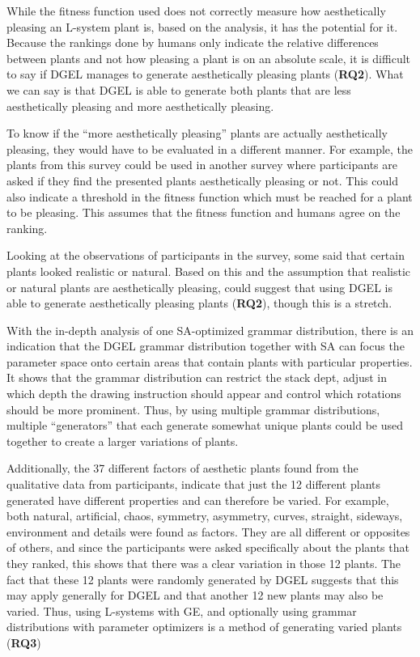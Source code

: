 While the fitness function used does not correctly measure how aesthetically pleasing an \gls{L-system} plant is, based on the analysis, it has the potential for it.
Because the rankings done by humans only indicate the relative differences between plants and not how pleasing a plant is on an absolute scale, it is difficult to say if \gls{DGEL} manages to generate aesthetically pleasing plants (\textbf{RQ2}).
What we can say is that \gls{DGEL} is able to generate both plants that are less aesthetically pleasing and more aesthetically pleasing.

To know if the ``more aesthetically pleasing'' plants are actually aesthetically pleasing, they would have to be evaluated in a different manner.
For example, the plants from this survey could be used in another survey where participants are asked if they find the presented plants aesthetically pleasing or not.
This could also indicate a threshold in the fitness function which must be reached for a plant to be pleasing.
This assumes that the fitness function and humans agree on the ranking.

Looking at the observations of participants in the survey, some said that certain plants looked realistic or natural.
Based on this and the assumption that realistic or natural plants are aesthetically pleasing, could suggest that using \gls{DGEL} is able to generate aesthetically pleasing plants (\textbf{RQ2}), though this is a stretch.

With the in-depth analysis of one \gls{SA}-optimized grammar distribution, there is an indication that the \gls{DGEL} grammar distribution together with \gls{SA} can focus the parameter space onto certain areas that contain plants with particular properties.
It shows that the grammar distribution can restrict the stack dept, adjust in which depth the drawing instruction should appear and control which rotations should be more prominent.
Thus, by using multiple grammar distributions, multiple ``generators'' that each generate somewhat unique plants could be used together to create a larger variations of plants.

Additionally, the 37 different factors of aesthetic plants found from the qualitative data from participants, indicate that just the 12 different plants generated have different properties and can therefore be varied.
For example, both natural, artificial, chaos, symmetry, asymmetry, curves, straight, sideways, environment and details were found as factors.
They are all different or opposites of others, and since the participants were asked specifically about the plants that they ranked, this shows that there was a clear variation in those 12 plants.
The fact that these 12 plants were randomly generated by \gls{DGEL} suggests that this may apply generally for \gls{DGEL} and that another 12 new plants may also be varied.
Thus, using \glspl{L-system} with \gls{GE}, and optionally using grammar distributions with parameter optimizers is a method of generating varied plants (\textbf{RQ3})


